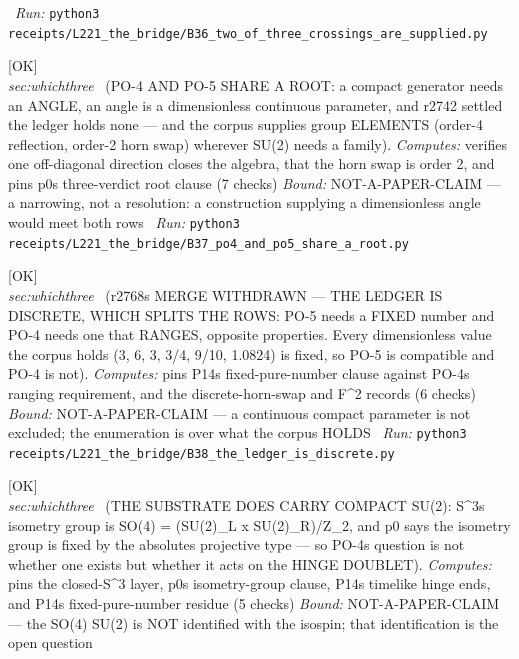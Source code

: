 \begin{description}
\ \emph{Run:} \texttt{python3 receipts/L221\_the\_bridge/B36\_two\_of\_three\_crossings\_are\_supplied.py}
\item[\label{rcpt:B37_po4_and_po5_share_a_root}\texttt{B37\_po4\_and\_po5\_share\_a\_root}]\hfill\textsf{[OK]}\\
\textit{sec:whichthree} \ (PO-4 AND PO-5 SHARE A ROOT: a compact generator needs an ANGLE, an angle is a dimensionless continuous parameter, and r2742 settled the ledger holds none --- and the corpus supplies group ELEMENTS (order-4 reflection, order-2 horn swap) wherever SU(2) needs a family). 
\emph{Computes:} verifies one off-diagonal direction closes the algebra, that the horn swap is order 2, and pins p0s three-verdict root clause (7 checks)
 \emph{Bound:} NOT-A-PAPER-CLAIM --- a narrowing, not a resolution: a construction supplying a dimensionless angle would meet both rows
\ \emph{Run:} \texttt{python3 receipts/L221\_the\_bridge/B37\_po4\_and\_po5\_share\_a\_root.py}
\item[\label{rcpt:B38_the_ledger_is_discrete}\texttt{B38\_the\_ledger\_is\_discrete}]\hfill\textsf{[OK]}\\
\textit{sec:whichthree} \ (r2768s MERGE WITHDRAWN --- THE LEDGER IS DISCRETE, WHICH SPLITS THE ROWS: PO-5 needs a FIXED number and PO-4 needs one that RANGES, opposite properties. Every dimensionless value the corpus holds (3, 6, 3, 3/4, 9/10, 1.0824) is fixed, so PO-5 is compatible and PO-4 is not). 
\emph{Computes:} pins P14s fixed-pure-number clause against PO-4s ranging requirement, and the discrete-horn-swap and F\textasciicircum{}2 records (6 checks)
 \emph{Bound:} NOT-A-PAPER-CLAIM --- a continuous compact parameter is not excluded; the enumeration is over what the corpus HOLDS
\ \emph{Run:} \texttt{python3 receipts/L221\_the\_bridge/B38\_the\_ledger\_is\_discrete.py}
\item[\label{rcpt:B39_the_substrate_does_carry_compact_su2}\texttt{B39\_the\_substrate\_does\_carry\_compact\_su2}]\hfill\textsf{[OK]}\\
\textit{sec:whichthree} \ (THE SUBSTRATE DOES CARRY COMPACT SU(2): S\textasciicircum{}3s isometry group is SO(4) = (SU(2)\_L x SU(2)\_R)/Z\_2, and p0 says the isometry group is fixed by the absolutes projective type --- so PO-4s question is not whether one exists but whether it acts on the HINGE DOUBLET). 
\emph{Computes:} pins the closed-S\textasciicircum{}3 layer, p0s isometry-group clause, P14s timelike hinge ends, and P14s fixed-pure-number residue (5 checks)
 \emph{Bound:} NOT-A-PAPER-CLAIM --- the SO(4) SU(2) is NOT identified with the isospin; that identification is the open question

\end{description}
